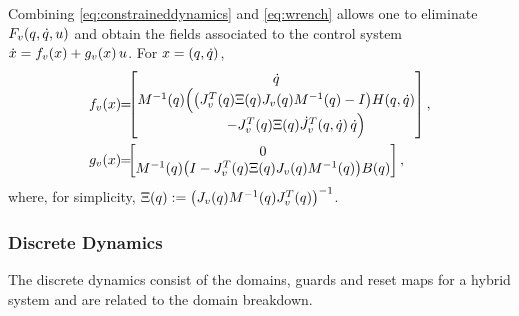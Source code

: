 %
Combining \eqref{eq:constraineddynamics} and \eqref{eq:wrench} allows one to eliminate $F_{v}(q, \dot{q}, u)$ and obtain the fields associated to the control system ${\dot {x}} = f_{v}(x) + g_{v}(x) \, u$. For $x = (q, \dot{q})$,
%
\begin{align}
  f_{v}\arx \!\! &= \!\!\! \left[\!\!\!\begin{array}{c}
    \dq\\
    \M^{-1}\argsq\Big( \big(J_{v}^{T}\argsq \Xi\argsq J_{v}\argsq \M^{-1}\argsq - I \big) \HCor\argsqdq \\
    \hspace{1cm}- J_{v}^{T}\argsq \Xi\argsq {\dot J}_{v}^{T}\argsqdq \, \dq \Big)
    \end{array}\!\!\!\right],\\
  \label{eq:controlsystem}
  g_{v}\arx \!\! &= \!\!\! \left[\!\!\!\begin{array}{c}
    0\\
    \M^{-1}\argsq \big(I - J_{v}^{T}\argsq \Xi\argsq J_{v}\argsq \M^{-1}\argsq \big) \B\argsq
    \end{array}\!\!\!\right],
\end{align}
%
where, for simplicity, $\Xi(q) := \big( J_{v}(q) M^{-1}(q) J_{v}^{T}(q) \big)^{-1}$.


\subsubsection{Discrete Dynamics}

The discrete dynamics consist of the domains, guards and reset maps for a hybrid system and are related to the domain breakdown.

